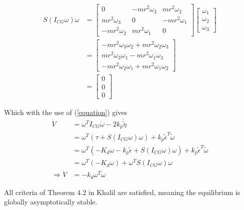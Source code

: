 \begin{align} \label{equation}
     S(I_{CG}\omega)\omega &=
     \begin{bmatrix}
         0 & -mr^2\omega_3 & mr^2\omega_2 \\
         mr^2\omega_3 & 0 & -mr^2\omega_1 \\
         -mr^2\omega_2 & mr^2\omega_1 & 0 
     \end{bmatrix}
     \begin{bmatrix}
         \omega_1 \\
         \omega_2 \\
         \omega_3 
     \end{bmatrix} \\
     &= 
     \begin{bmatrix}
         -mr^2\omega_3\omega_2 + mr^2\omega_2\omega_3 \\
         mr^2\omega_3\omega_1 - mr^2\omega_1\omega_3 \\
         -mr^2\omega_2\omega_1 + mr^2\omega_1\omega_2 
     \end{bmatrix} \\
     &= 
     \begin{bmatrix}
         0 \\
         0 \\
         0
     \end{bmatrix} 
\end{align}

Which with the use of (\ref{equation}) gives 
\begin{align}
    \dot{V} &= \omega^TI_{CG}\dot{\omega} - 2k_p\dot{\tilde{\eta}} \\
    &= \omega^T(\tau + S(I_{CG}\omega)\omega) + k_p\tilde{\epsilon}^T\tilde{\omega} \\
    &= \omega^T(-K_d\omega - k_p\tilde{\epsilon} +S(I_{CG}\omega)\omega) + k_p\tilde{\epsilon}^T\tilde{\omega} \\
    &= \omega ^T (-K_d\omega) + \omega^TS(I_{CG} \omega)\omega \\
    \Rightarrow \dot{V} &= -k_d\omega^T\omega 
\end{align}

All criteria of Theorem 4.2 in Khalil\cite{Khalil} are satisfied, meaning the equilibrium is globally asymptotically stable.
